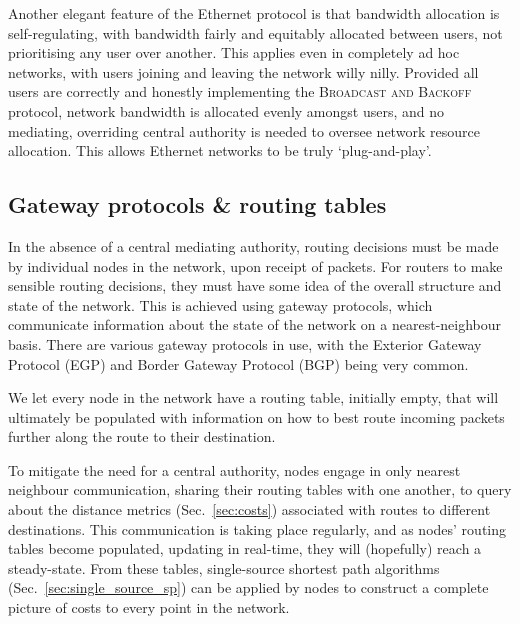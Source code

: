 \documentclass[aps, rmp, twocolumn, amsmath, amssymb, nofootinbib, superscriptaddress, longbibliography, floatfix, table-of-contents, eqsecnum]{revtex4-1}
\begin{document}
Another elegant feature of the Ethernet protocol is that bandwidth allocation is self-regulating, with bandwidth fairly and equitably allocated between users, not prioritising any user over another. This applies even in completely ad hoc networks, with users joining and leaving the network willy nilly. Provided all users are correctly and honestly implementing the \textsc{Broadcast and Backoff} protocol, network bandwidth is allocated evenly amongst users, and no mediating, overriding central authority is needed to oversee network resource allocation. This allows Ethernet networks to be truly `plug-and-play'.

%
%

\subsection{Gateway protocols \& routing tables} \label{sec:gateway}  

In the absence of a central mediating authority, routing decisions must be made by individual nodes in the network, upon receipt of packets. For routers to make sensible routing decisions, they must have some idea of the overall structure and state of the network. This is achieved using gateway protocols, which communicate information about the state of the network on a nearest-neighbour basis. There are various gateway protocols in use, with the Exterior Gateway Protocol (EGP) and Border Gateway Protocol (BGP) being very common.

We let every node in the network have a routing table, initially empty, that will ultimately be populated with information on how to best route incoming packets further along the route to their destination.

To mitigate the need for a central authority, nodes engage in only nearest neighbour communication, sharing their routing tables with one another, to query about the distance metrics (Sec.~\ref{sec:costs}) associated with routes to different destinations. This communication is taking place regularly, and as nodes' routing tables become populated, updating in real-time, they will (hopefully) reach a steady-state. From these tables, single-source shortest path algorithms (Sec.~\ref{sec:single_source_sp}) can be applied by nodes to construct a complete picture of costs to every point in the network.
\end{document}
